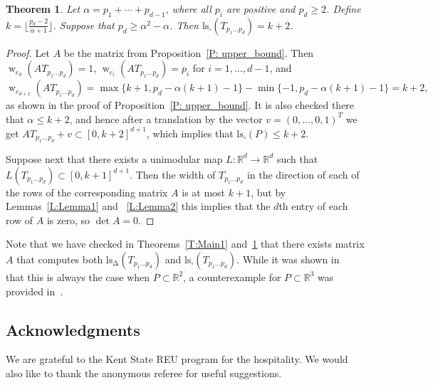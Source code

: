 \documentclass[11pt]{amsart}
\numberwithin{equation}{section}
\theoremstyle{plain}
\newtheorem{Theorem}{Theorem}[section]
\theoremstyle{definition}
\newcommand{\R}{\mathbb R}
\newcommand{\w}{\operatorname{w}}
\newcommand{\ls}{\operatorname{ls_\Delta}}
\newcommand{\lss}{\operatorname{ls_\square}}
\begin{document}
\begin{Theorem}\label{T:Main2}  Let $\alpha=p_1+\cdots+p_{d-1}$, where all $p_i$ are positive and $p_d\geq 2$. Define $k=\lfloor\frac{p_d-2}{\alpha+1}\rfloor$. Suppose that $p_d\geq \alpha^2-\alpha$. Then $\lss(T_{p_1\dots p_d})=k+2$.
\end{Theorem}
\begin{proof}
Let $A$ be the matrix from Proposition~\ref{P: upper_bound}. Then $\w_{e_{d}}(AT_{p_1\dots p_d})=1$, $\w_{e_i}(AT_{p_1\dots p_d})=p_i$ for $i=1,\dots, d-1$, 
and 
$$\w_{e_{d+1}}(AT_{p_1\dots p_d})=\max\{k+1,p_d-\alpha(k+1)-1\}-\min\{-1,p_d-\alpha(k+1)-1\}=k+2,
$$
as shown in the proof of Proposition~\ref{P: upper_bound}. It is also checked there that $\alpha\leq k+2$, and hence after a translation by the vector $v=(0,\dots,0,1)^T$ we get
$AT_{p_1\dots p_d}+v\subset  [0,k+2]^{d+1}$, which implies that $\lss(P)\leq k+2$. 

Suppose next that there exists a unimodular map $L\colon\R^d\to\R^d$ such that $L(T_{p_1\dots p_d})\subset  [0,k+1]^{d+1}$. Then the width of $T_{p_1\dots p_d}$ in the direction of each of the rows of the corresponding matrix $A$ is at most $k+1$, but by Lemmas~\ref{L:Lemma1} and ~\ref{L:Lemma2} this implies that the $d$th entry of each row of $A$ is zero, so $\det A=0$.

\end{proof}

Note that we have checked in Theorems~\ref{T:Main1} and~\ref{T:Main2} that there exists  matrix $A$ that computes both $\ls(T_{p_1\dots p_d})$ and $\lss(T_{p_1\dots p_d})$. While it was shown in~\cite{HarSopr, HarSoprTier} that this is always the case when $P\subset\R^2$, a counterexample for  $P\subset\R^{3}$ was provided in~\cite{HarSopr}.


\subsection*{Acknowledgments} 
We are grateful to the Kent State REU program for the hospitality. We would also like to thank the anonymous referee for useful suggestions.
\end{document}

